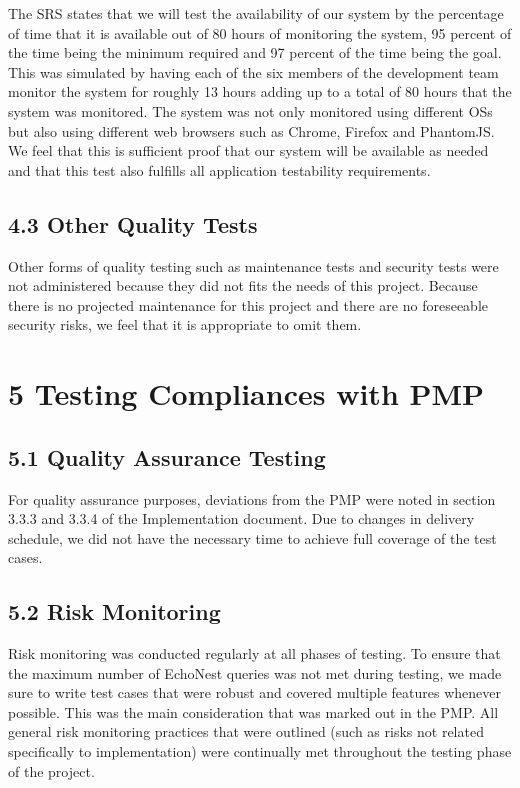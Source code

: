 \documentclass[]{article}
\begin{document}
The SRS states that we will test the availability of our system by the
percentage of time that it is available out of 80 hours of monitoring
the system, 95 percent of the time being the minimum required and 97
percent of the time being the goal. This was simulated by having each of
the six members of the development team monitor the system for roughly
13 hours adding up to a total of 80 hours that the system was monitored.
The system was not only monitored using different OSs but also using
different web browsers such as Chrome, Firefox and PhantomJS. We feel
that this is sufficient proof that our system will be available as
needed and that this test also fulfills all application testability
requirements.

\subsection{\textbf{4.3 Other Quality Tests}}\label{other-quality-tests}

Other forms of quality testing such as maintenance tests and security
tests were not administered because they did not fits the needs of this
project. Because there is no projected maintenance for this project and
there are no foreseeable security risks, we feel that it is appropriate
to omit them.

\section{\textbf{5 Testing Compliances with
PMP}}\label{testing-compliances-with-pmp}

\subsection{\textbf{5.1 Quality Assurance
Testing}}\label{quality-assurance-testing}

For quality assurance purposes, deviations from the PMP were noted in
section 3.3.3 and 3.3.4 of the Implementation document. Due to changes
in delivery schedule, we did not have the necessary time to achieve full
coverage of the test cases.

\subsection{\textbf{5.2 Risk Monitoring}}\label{risk-monitoring}

Risk monitoring was conducted regularly at all phases of testing. To
ensure that the maximum number of EchoNest queries was not met during
testing, we made sure to write test cases that were robust and covered
multiple features whenever possible. This was the main consideration
that was marked out in the PMP. All general risk monitoring practices
that were outlined (such as risks not related specifically to
implementation) were continually met throughout the testing phase of the
project.
\end{document}
